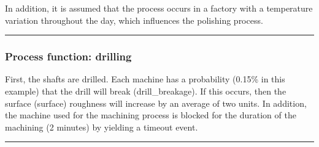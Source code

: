 \documentclass[letterpaper,10pt,english]{sphinxmanual}
\begin{document}

\sphinxAtStartPar
In addition, it is assumed that the process occurs in a factory with a temperature variation throughout the day, which
influences the polishing process.


\bigskip\hrule\bigskip



\subsubsection{Process function: drilling}
\label{\detokenize{source/Examples/example02:process-function-drilling}}\label{\detokenize{source/Examples/example02:drilling}}
\sphinxAtStartPar
First, the shafts are drilled. Each machine has a probability (0.15\% in this example) that the drill will break
(drill\_breakage). If this occurs, then the surface (surface) roughness will increase by an average of two units. In
addition, the machine used for the machining process is blocked for the duration of the machining (2 minutes) by
yielding a timeout event.

\begin{sphinxVerbatim}[commandchars=\\\{\}]
    

       
           

     
\end{sphinxVerbatim}


\bigskip\hrule\bigskip
\end{document}
